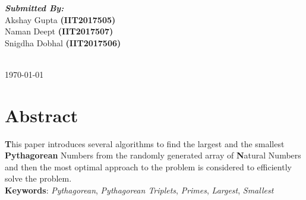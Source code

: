 \documentclass[twocolumn]{article}      %
\begin{document}
\begin{titlepage}
\begin{minipage}{0.4\textwidth}
\begin{flushleft} \large
\textbf{\emph{Submitted By:}}\\
Akshay Gupta \textbf{(IIT2017505)}\\
Naman Deept \textbf{(IIT2017507)}\\
Snigdha Dobhal \textbf{(IIT2017506)}
\end{flushleft}

\end{minipage}\\[2cm]



{\large \today}\\[2cm] %

\vfill %

\end{titlepage}
\maketitle                   %



\section{Abstract} 
\textbf{T}his paper introduces several algorithms to find the largest and the smallest \textbf{Pythagorean} Numbers from the randomly generated array of \textbf{N}atural Numbers and then the most optimal approach to the problem is considered to efficiently solve the problem.\\
\textbf{Keywords}: \textit{Pythagorean}, \textit{Pythagorean Triplets}, \textit{Primes}, \textit{Largest}, \textit{Smallest}
\end{document}
